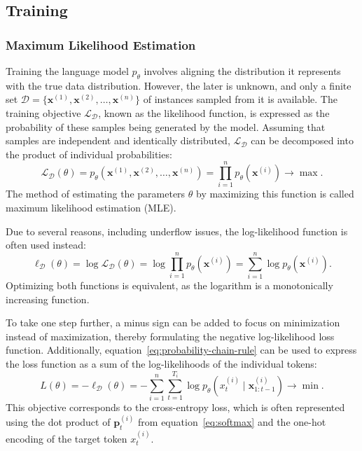 \subsection{Training}


\subsubsection*{Maximum Likelihood Estimation}

Training the language model \(p_\theta\) involves aligning the distribution it represents with the true data distribution. However, the later is unknown, and only a finite set \(\mathcal{D} = \{\bm{x}^{(1)}, \bm{x}^{(2)}, \ldots, \bm{x}^{(n)}\}\) of instances sampled from it is available. The training objective \(\mathcal{L}_{\mathcal{D}}\), known as the likelihood function, is expressed as the probability of these samples being generated by the model. Assuming that samples are independent and identically distributed, \(\mathcal{L}_{\mathcal{D}}\) can be decomposed into the product of individual probabilities:
\begin{equation}
	\mathcal{L}_{\mathcal{D}}(\theta) = p_{\theta}(\bm{x}^{(1)}, \bm{x}^{(2)}, \ldots, \bm{x}^{(n)}) = \prod_{i=1}^{n} p_{\theta}(\bm{x}^{(i)}) \rightarrow \max.
\end{equation}
The method of estimating the parameters \(\theta\) by maximizing this function is called maximum likelihood estimation (MLE).

Due to several reasons, including underflow issues, the log-likelihood function is often used instead:
\begin{equation}
	\ell_{\mathcal{D}}(\theta) = \log \mathcal{L}_{\mathcal{D}}(\theta) = \log \prod_{i=1}^{n} p_{\theta}(\bm{x}^{(i)}) = \sum_{i=1}^{n} \log p_{\theta}(\bm{x}^{(i)}).
\end{equation}
Optimizing both functions is equivalent, as the logarithm is a monotonically increasing function.

To take one step further, a minus sign can be added to focus on minimization instead of maximization, thereby formulating the negative log-likelihood loss function. Additionally, equation~\ref{eq:probability-chain-rule} can be used to express the loss function as a sum of the log-likelihoods of the individual tokens:
\begin{equation}
	L(\theta) = -\ell_{\mathcal{D}}(\theta) = -\sum_{i=1}^{n} \sum_{t=1}^{T_i} \log p_{\theta}(x^{(i)}_t \mid \bm{x}^{(i)}_{1:t-1}) \rightarrow \min.
\end{equation}
This objective corresponds to the cross-entropy loss, which is often represented using the dot product of \(\mathbf{p}^{(i)}_t\) from equation~\ref{eq:softmax} and the one-hot encoding of the target token \(x^{(i)}_t\).

